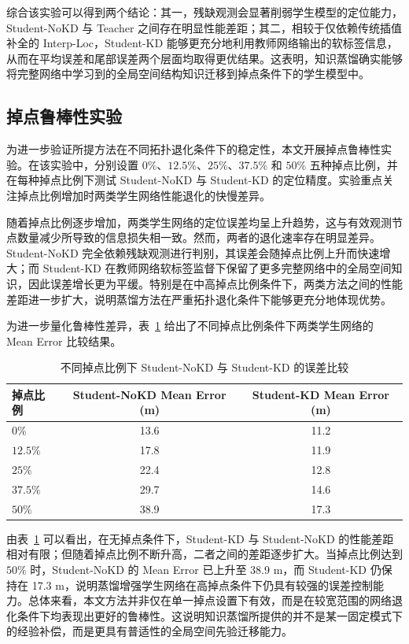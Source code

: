 综合该实验可以得到两个结论：其一，残缺观测会显著削弱学生模型的定位能力，Student-NoKD 与 Teacher 之间存在明显性能差距；其二，相较于仅依赖传统插值补全的 Interp-Loc，Student-KD 能够更充分地利用教师网络输出的软标签信息，从而在平均误差和尾部误差两个层面均取得更优结果。这表明，知识蒸馏确实能够将完整网络中学习到的全局空间结构知识迁移到掉点条件下的学生模型中。

\subsection{掉点鲁棒性实验}
\label{subsec:4_4_3}

为进一步验证所提方法在不同拓扑退化条件下的稳定性，本文开展掉点鲁棒性实验。在该实验中，分别设置 \(0\%\)、\(12.5\%\)、\(25\%\)、\(37.5\%\) 和 \(50\%\) 五种掉点比例，并在每种掉点比例下测试 Student-NoKD 与 Student-KD 的定位精度。实验重点关注掉点比例增加时两类学生网络性能退化的快慢差异。

随着掉点比例逐步增加，两类学生网络的定位误差均呈上升趋势，这与有效观测节点数量减少所导致的信息损失相一致。然而，两者的退化速率存在明显差异。Student-NoKD 完全依赖残缺观测进行判别，其误差会随掉点比例上升而快速增大；而 Student-KD 在教师网络软标签监督下保留了更多完整网络中的全局空间知识，因此误差增长更为平缓。特别是在中高掉点比例条件下，两类方法之间的性能差距进一步扩大，说明蒸馏方法在严重拓扑退化条件下能够更充分地体现优势。

为进一步量化鲁棒性差异，表~\ref{tab:ch4_dropout_compare} 给出了不同掉点比例条件下两类学生网络的 Mean Error 比较结果。

\begin{table}[htbp]
    \centering
    \caption{不同掉点比例下 Student-NoKD 与 Student-KD 的误差比较}
    \label{tab:ch4_dropout_compare}
    \begin{tabular}{lcc}
        \toprule
        \textbf{掉点比例} & \textbf{Student-NoKD Mean Error (m)} & \textbf{Student-KD Mean Error (m)} \\
        \midrule
        \(0\%\) & 13.6 & 11.2 \\
        \(12.5\%\) & 17.8 & 11.9 \\
        \(25\%\) & 22.4 & 12.8 \\
        \(37.5\%\) & 29.7 & 14.6 \\
        \(50\%\) & 38.9 & 17.3 \\
        \bottomrule
    \end{tabular}
\end{table}

由表~\ref{tab:ch4_dropout_compare} 可以看出，在无掉点条件下，Student-KD 与 Student-NoKD 的性能差距相对有限；但随着掉点比例不断升高，二者之间的差距逐步扩大。当掉点比例达到 \(50\%\) 时，Student-NoKD 的 Mean Error 已上升至 38.9 m，而 Student-KD 仍保持在 17.3 m，说明蒸馏增强学生网络在高掉点条件下仍具有较强的误差控制能力。总体来看，本文方法并非仅在单一掉点设置下有效，而是在较宽范围的网络退化条件下均表现出更好的鲁棒性。这说明知识蒸馏所提供的并不是某一固定模式下的经验补偿，而是更具有普适性的全局空间先验迁移能力。

